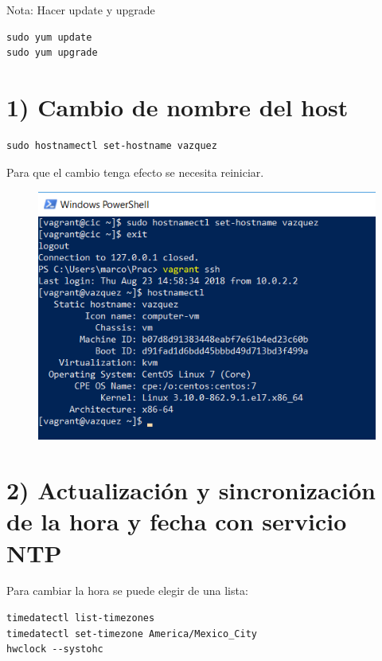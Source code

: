 \documentclass[]{article}
\begin{document}
Nota: Hacer update y upgrade

\begin{verbatim}
sudo yum update
sudo yum upgrade
\end{verbatim}

\section{1) Cambio de nombre del host}\label{cambio-de-nombre-del-host}

\begin{verbatim}
sudo hostnamectl set-hostname vazquez
\end{verbatim}

Para que el cambio tenga efecto se necesita reiniciar.

\begin{figure}[htbp]
\centering
\includegraphics{hostnamectl.png}
\end{figure}

\section{2) Actualización y sincronización de la hora y fecha con
servicio
NTP}\label{actualizacion-y-sincronizacion-de-la-hora-y-fecha-con-servicio-ntp}

Para cambiar la hora se puede elegir de una lista:

\begin{verbatim}
timedatectl list-timezones
timedatectl set-timezone America/Mexico_City
hwclock --systohc
\end{verbatim}
\end{document}
